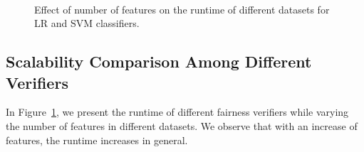 \begin{figure}
\begin{center}
			\\
			
%			
			\caption[Ablation study: effect of the number of features]{Effect of number of features on the runtime of different datasets for LR and SVM classifiers.}
			\label{fairness_fvgm_fig:time_vary_features}
			
			
			
		\end{center}
		
		
	\end{figure}
	
	
	\subsection{Scalability Comparison Among Different Verifiers}
	
	In Figure~\ref{fairness_fvgm_fig:time_vary_features}, we present the runtime of different fairness verifiers while varying the number of features in different datasets. We observe that with an increase of features, the runtime increases in general.
	
	
	
	
	
	
	
	
	
		
	
		
